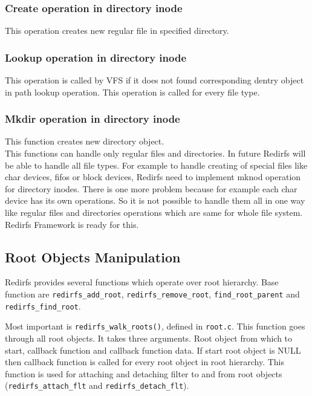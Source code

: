 \subsubsection{Create operation in directory inode}
This operation creates new regular file in specified directory.

\subsubsection{Lookup operation in directory inode}
This operation is called by VFS if it does not found corresponding dentry object in
path lookup operation. This operation is called for every file type.

\subsubsection{Mkdir operation in directory inode}
This function creates new directory object.\\

This functions can handle only regular files and directories. In future Redirfs will be
able to handle all file types. For example to handle creating of special files like
char devices, fifos or block devices, Redirfs need to implement mknod operation for
directory inodes. There is one more problem because for example each char device has
its own operations. So it is not possible to handle them all in one way like regular
files and directories operations which are same for whole file system. Redirfs
Framework is ready for this.

\subsection{Root Objects Manipulation}
Redirfs provides several functions which operate over root hierarchy. Base function
are \texttt{redirfs\_add\_root{}}, \texttt{redirfs\_remove\_root},
\texttt{find\_root\_parent} and \texttt{redirfs\_find\_root}. 

Most important is \texttt{redirfs\_walk\_roots()}, defined in \texttt{root.c}. This
function goes through all root objects. It takes three arguments. Root object from
which to start, callback function and callback function data. If start root object is
NULL then callback function is called for every root object in root hierarchy. This
function is used for attaching and detaching filter to and from root objects
(\texttt{redirfs\_attach\_flt} and \texttt{redirfs\_detach\_flt}). 

